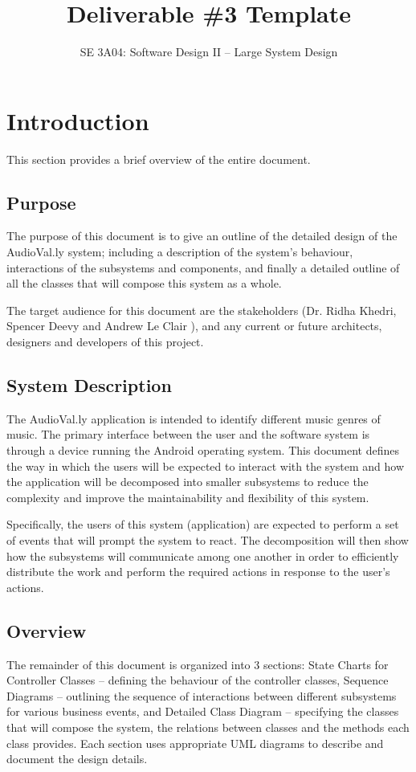 \documentclass[]{article}
\title{Deliverable \#3 Template}
\author{SE 3A04: Software Design II -- Large System Design}
\date{}
\begin{document}
\maketitle	

\section{Introduction}
\label{sec:introduction}

This section provides a brief overview of the entire document.

\subsection{Purpose}
\label{sub:purpose}

The purpose of this document is to give an outline of the detailed design of the AudioVal.ly system; including a description of the system's behaviour, interactions of the subsystems and components, and finally a detailed outline of all the classes that will compose this system as a whole.

The target audience for this document are the stakeholders (Dr. Ridha Khedri, Spencer Deevy and Andrew Le Clair ), and any current or future architects, designers and developers of this project.

\subsection{System Description}
\label{sub:system_description}

The AudioVal.ly application is intended to identify different music genres of music. The primary interface between the user and the software system is through a device running the Android
operating system. This document defines the way in which the users will be expected to interact with the system and how the application will be decomposed into smaller subsystems to reduce the complexity and improve the maintainability and flexibility of this system.

Specifically, the users of this system (application) are expected to perform a set of events that will prompt the system to react. The decomposition will then show how the subsystems will communicate among one another in order to efficiently distribute the work and perform the required actions in response to the user's actions.


\subsection{Overview}
\label{sub:overview}
The remainder of this document is organized into 3 sections: State Charts for Controller Classes -- defining the behaviour of the controller classes, Sequence Diagrams -- outlining the sequence of interactions between different subsystems for various business events, and Detailed Class Diagram -- specifying the classes that will compose the system, the relations between
classes and the methods each class provides. Each section uses appropriate UML diagrams to describe and document the design details.
\end{document}
